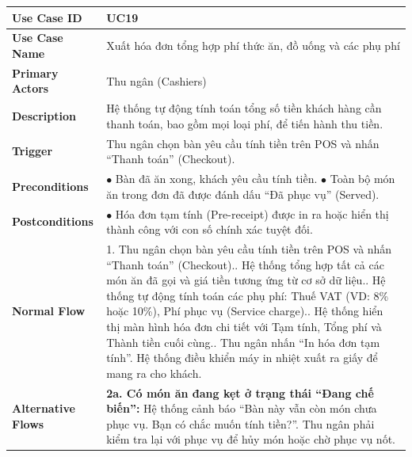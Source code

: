 \begin{longtable}{|p{3.5cm}|p{12.5cm}|}
\hline
\textbf{Use Case ID} & UC19 \\ \hline
\textbf{Use Case Name} & Xuất hóa đơn tổng hợp phí thức ăn, đồ uống và các phụ phí \\ \hline
\textbf{Primary Actors} & Thu ngân (Cashiers) \\ \hline
\textbf{Description} & Hệ thống tự động tính toán tổng số tiền khách hàng cần thanh toán, bao gồm mọi loại phí, để tiến hành thu tiền. \\ \hline
\textbf{Trigger} & Thu ngân chọn bàn yêu cầu tính tiền trên POS và nhấn ``Thanh toán'' (Checkout). \\ \hline
\textbf{Preconditions} &
$\bullet$ Bàn đã ăn xong, khách yêu cầu tính tiền.\newline
$\bullet$ Toàn bộ món ăn trong đơn đã được đánh dấu ``Đã phục vụ'' (Served). \\ \hline
\textbf{Postconditions} & $\bullet$ Hóa đơn tạm tính (Pre-receipt) được in ra hoặc hiển thị thành công với con số chính xác tuyệt đối. \\ \hline
\textbf{Normal Flow} &
1. Thu ngân chọn bàn yêu cầu tính tiền trên POS và nhấn ``Thanh toán'' (Checkout).\newline
2. Hệ thống tổng hợp tất cả các món ăn đã gọi và giá tiền tương ứng từ cơ sở dữ liệu.\newline
3. Hệ thống tự động tính toán các phụ phí: Thuế VAT (VD: 8\% hoặc 10\%), Phí phục vụ (Service charge).\newline
4. Hệ thống hiển thị màn hình hóa đơn chi tiết với Tạm tính, Tổng phí và Thành tiền cuối cùng.\newline
5. Thu ngân nhấn ``In hóa đơn tạm tính''. Hệ thống điều khiển máy in nhiệt xuất ra giấy để mang ra cho khách. \\ \hline
\textbf{Alternative Flows} &
\textbf{2a. Có món ăn đang kẹt ở trạng thái ``Đang chế biến'':} Hệ thống cảnh báo ``Bàn này vẫn còn món chưa phục vụ. Bạn có chắc muốn tính tiền?''. Thu ngân phải kiểm tra lại với phục vụ để hủy món hoặc chờ phục vụ nốt. \\ \hline
\end{longtable}

